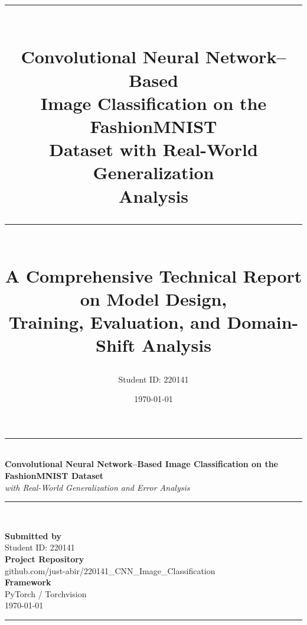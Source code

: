 \documentclass[12pt,a4paper]{report}
\title{
  \vspace{-2cm}
  {\color{navy}\rule{\linewidth}{2pt}}\\[0.4cm]
  {\Huge\bfseries Convolutional Neural Network--Based\\ Image Classification on the FashionMNIST\\ Dataset with Real-World Generalization\\ Analysis}\\[0.4cm]
  {\color{navy}\rule{\linewidth}{2pt}}\\[1cm]
  {\large A Comprehensive Technical Report on Model Design,\\ Training, Evaluation, and Domain-Shift Analysis}
}
\author{Student ID: 220141}
\date{\today}
\begin{document}
\begin{titlepage}
\centering
\vspace*{1cm}
{\color{navy}\rule{\linewidth}{3pt}}\\[0.6cm]
{\Huge\bfseries Convolutional Neural Network--Based Image Classification on the FashionMNIST Dataset}\\[0.6cm]
{\Large\itshape with Real-World Generalization and Error Analysis}\\[0.6cm]
{\color{navy}\rule{\linewidth}{3pt}}\\[2cm]


\vspace{2.5cm}

{\Large\bfseries Submitted by}\\[0.3cm]
{\Large Student ID: 220141}\\[1.5cm]

{\Large\bfseries Project Repository}\\[0.3cm]
{\large\ttfamily github.com/just-abir/220141\_CNN\_Image\_Classification}\\[1.5cm]

{\Large\bfseries Framework}\\[0.3cm]
{\large PyTorch / Torchvision}\\[2cm]

\vfill
{\large \today}\\[0.3cm]
{\color{navy}\rule{0.6\linewidth}{1.5pt}}
\end{titlepage}

\end{document}
